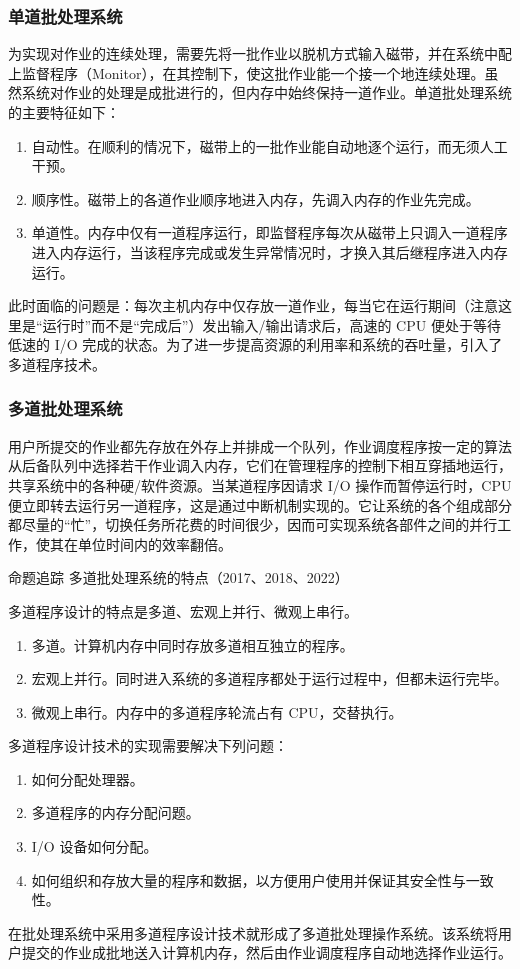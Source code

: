 \documentclass{ctexbook}
\begin{document}
	\subsubsection{单道批处理系统}
	为实现对作业的连续处理，需要先将一批作业以脱机方式输入磁带，并在系统中配上监督程序（Monitor），在其控制下，使这批作业能一个接一个地连续处理。虽然系统对作业的处理是成批进行的，但内存中始终保持一道作业。单道批处理系统的主要特征如下：
	\begin{enumerate}
		\item 自动性。在顺利的情况下，磁带上的一批作业能自动地逐个运行，而无须人工干预。
		\item 顺序性。磁带上的各道作业顺序地进入内存，先调入内存的作业先完成。
		\item 单道性。内存中仅有一道程序运行，即监督程序每次从磁带上只调入一道程序进入内存运行，当该程序完成或发生异常情况时，才换入其后继程序进入内存运行。
	\end{enumerate}
	此时面临的问题是：每次主机内存中仅存放一道作业，每当它在运行期间（注意这里是“运行时”而不是“完成后”）发出输入/输出请求后，高速的 CPU 便处于等待低速的 I/O 完成的状态。为了进一步提高资源的利用率和系统的吞吐量，引入了多道程序技术。
	
	\subsubsection{多道批处理系统}
	用户所提交的作业都先存放在外存上并排成一个队列，作业调度程序按一定的算法从后备队列中选择若干作业调入内存，它们在管理程序的控制下相互穿插地运行，共享系统中的各种硬/软件资源。当某道程序因请求 I/O 操作而暂停运行时，CPU 便立即转去运行另一道程序，这是通过中断机制实现的。它让系统的各个组成部分都尽量的“忙”，切换任务所花费的时间很少，因而可实现系统各部件之间的并行工作，使其在单位时间内的效率翻倍。
	
	\colorbox{gray!20}{命题追踪 \enspace 多道批处理系统的特点（2017、2018、2022）}
	
	多道程序设计的特点是多道、宏观上并行、微观上串行。
	\begin{enumerate}
		\item 多道。计算机内存中同时存放多道相互独立的程序。
		\item 宏观上并行。同时进入系统的多道程序都处于运行过程中，但都未运行完毕。
		\item 微观上串行。内存中的多道程序轮流占有 CPU，交替执行。
	\end{enumerate}
	
	多道程序设计技术的实现需要解决下列问题：
	\begin{enumerate}
		\item 如何分配处理器。
		\item 多道程序的内存分配问题。
		\item I/O 设备如何分配。
		\item 如何组织和存放大量的程序和数据，以方便用户使用并保证其安全性与一致性。
	\end{enumerate}
	在批处理系统中采用多道程序设计技术就形成了多道批处理操作系统。该系统将用户提交的作业成批地送入计算机内存，然后由作业调度程序自动地选择作业运行。
	
\end{document}
